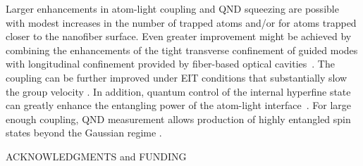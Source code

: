 \documentclass[aps,pra,twocolumn]{revtex4-1} %
\begin{document}
Larger enhancements in atom-light coupling and QND squeezing are possible with modest increases in the number of trapped atoms and/or for atoms trapped closer to the nanofiber surface.  
Even greater improvement might be achieved by combining the enhancements of the tight transverse confinement of guided modes with longitudinal confinement provided by fiber-based optical cavities~\cite{le_kien_intracavity_2009, wuttke_nanofiber_2012, yalla_cavity_2014, bohnet_reduced_2014,nayak_optical_2014}.  
The coupling can be further improved under EIT conditions that substantially slow the group velocity \cite{gouraud_demonstration_2015, sayrin_storage_2015, kumar_autler-townes_2015, le_kien_electromagnetically_2015}. 
In addition, quantum control of the internal hyperfine state \cite{smith_quantum_2013-1} can greatly enhance the entangling power of the atom-light interface~\cite{trail_strongly_2010, norris_enhanced_2012}. 
For large enough coupling, QND measurement allows production of highly entangled spin states beyond the Gaussian regime \cite{stockton_deterministic_2004, mcconnell_entanglement_2015}.

ACKNOWLEDGMENTS and FUNDING

%
%


\end{document}
